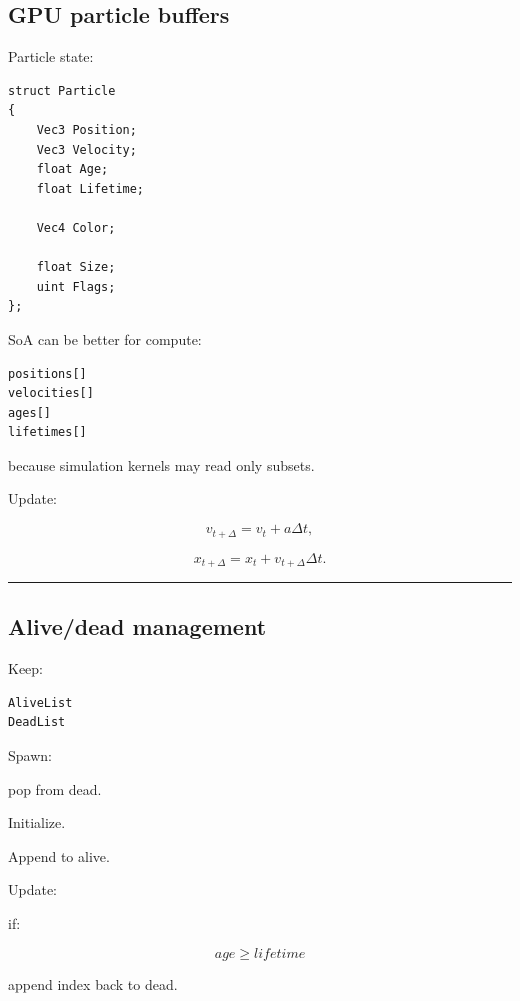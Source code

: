 \subsection{GPU particle buffers}\label{04-visual-computing-ii-ch040-gpu-particle-buffers}

\hypertarget{04-visual-computing-ii-ch040-gpu-particle-buffers}{}

Particle state:

\begin{verbatim}
struct Particle
{
    Vec3 Position;
    Vec3 Velocity;
    float Age;
    float Lifetime;

    Vec4 Color;

    float Size;
    uint Flags;
};
\end{verbatim}

SoA can be better for compute:

\begin{verbatim}
positions[]
velocities[]
ages[]
lifetimes[]
\end{verbatim}

because simulation kernels may read only subsets.

Update:

\[
v_{t+\Delta}
=
v_t+a\Delta t,
\]

\[
x_{t+\Delta}
=
x_t+v_{t+\Delta}\Delta t.
\]

\begin{center}\rule{0.5\linewidth}{0.5pt}\end{center}

\subsection{Alive/dead management}\label{04-visual-computing-ii-ch040-alivedead-management}

\hypertarget{04-visual-computing-ii-ch040-alivedead-management}{}

Keep:

\begin{verbatim}
AliveList
DeadList
\end{verbatim}

Spawn:

pop from dead.

Initialize.

Append to alive.

Update:

if:

\[
age\ge lifetime
\]

append index back to dead.


